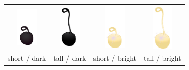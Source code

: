 \documentclass[man]{apa2}
\begin{document}
\begin{table}[h!]
\begin{center}
{\begin{tabular}{ccc|c}
                 \parbox[c]{3em}{\includegraphics[width=0.4in]{figures/appendixPix/shape4_d.png}} & \parbox[c]{3em}{\includegraphics[width=0.4in]{figures/appendixPix/shape4_a.png}} & \parbox[c]{3em}{\includegraphics[width=0.4in]{figures/appendixPix/shape4_b.png}} & \parbox[c]{3em}{\includegraphics[width=0.4in]{figures/appendixPix/shape4_c.png}}\\
       short / dark   & tall / dark & short / bright & tall / bright \\
               \hline              
     \end{tabular} 
}
  \end{center}
 \end{table}
\end{document}
